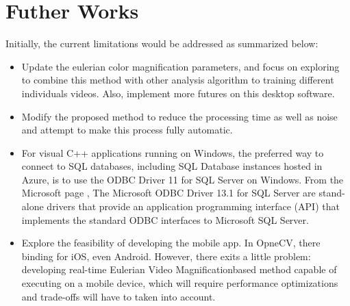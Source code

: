 \section{Futher Works}
Initially, the current limitations would be addressed as summarized below:
\begin{itemize}
\item Update the eulerian color magnification parameters, and focus on exploring to combine this method with other analysis algorithm to training different individuals videos. Also, implement more futures on this desktop software.
\item Modify the proposed method to reduce the processing time as well as noise and attempt to make this process fully automatic.
\item  For visual C++ applications running on Windows, the preferred way to connect to SQL databases, including SQL Database instances hosted in Azure, is to use the ODBC Driver 11 for SQL Server on Windows. From the Microsoft page \cite{microsoft2}, The Microsoft ODBC Driver 13.1 for SQL Server are stand-alone drivers that provide an application programming interface (API) that implements the standard ODBC interfaces to Microsoft SQL Server.
\item Explore the feasibility of developing the mobile app. In OpneCV, there binding for iOS, even Android. However, there exits a little problem: developing real-time Eulerian Video Magnificationbased method capable of executing on a mobile device, which will require performance optimizations and trade-offs will have to taken into account\cite{android}.
\end{itemize}

